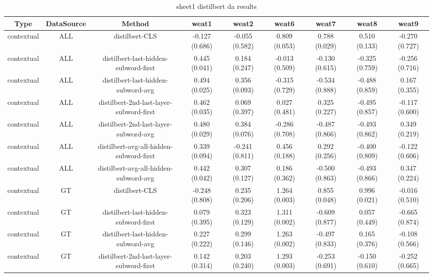 \begin{sidewaystable}[htb]
    \centering
    \caption{sheet1 distilbert da results}
    \label{appendix_tab:sheet1_distilbert_da_results}
    \small
    \begin{tabular}{@{}ccccccccc@{}}
        \toprule
        Type & DataSource & Method & weat1 & weat2 & weat6 & weat7 & weat8 & weat9 \\
        \midrule
        contextual & ALL & distilbert-CLS & -0.127 (0.686) & -0.055 (0.582) & 0.809 (0.053) & 0.788 (0.029) & 0.510 (0.133) & -0.270 (0.727) \\
        contextual & ALL & distilbert-last-hidden-subword-first & 0.445 (0.041) & 0.184 (0.247) & -0.013 (0.509) & -0.130 (0.615) & -0.325 (0.759) & -0.256 (0.716) \\
        contextual & ALL & distilbert-last-hidden-subword-avg & 0.494 (0.025) & 0.356 (0.093) & -0.315 (0.729) & -0.534 (0.888) & -0.488 (0.859) & 0.167 (0.355) \\
        contextual & ALL & distilbert-2nd-last-layer-subword-first & 0.462 (0.035) & 0.069 (0.397) & 0.027 (0.481) & 0.325 (0.227) & -0.495 (0.857) & -0.117 (0.600) \\
        contextual & ALL & distilbert-2nd-last-layer-subword-avg & 0.480 (0.029) & 0.384 (0.076) & -0.286 (0.708) & -0.487 (0.866) & -0.493 (0.862) & 0.349 (0.219) \\
        contextual & ALL & distilbert-avg-all-hidden-subword-first & 0.339 (0.094) & -0.241 (0.811) & 0.456 (0.188) & 0.292 (0.256) & -0.400 (0.809) & -0.122 (0.606) \\
        contextual & ALL & distilbert-avg-all-hidden-subword-avg & 0.442 (0.042) & 0.307 (0.127) & 0.186 (0.362) & -0.500 (0.863) & -0.493 (0.866) & 0.347 (0.224) \\
        contextual & GT & distilbert-CLS & -0.248 (0.808) & 0.235 (0.206) & 1.264 (0.003) & 0.855 (0.048) & 0.996 (0.021) & -0.016 (0.510) \\
        contextual & GT & distilbert-last-hidden-subword-first & 0.079 (0.395) & 0.323 (0.129) & 1.311 (0.002) & -0.609 (0.877) & 0.057 (0.449) & -0.665 (0.874) \\
        contextual & GT & distilbert-last-hidden-subword-avg & 0.227 (0.222) & 0.299 (0.146) & 1.263 (0.002) & -0.497 (0.833) & 0.165 (0.376) & -0.108 (0.566) \\
        contextual & GT & distilbert-2nd-last-layer-subword-first & 0.142 (0.314) & 0.203 (0.240) & 1.293 (0.003) & -0.253 (0.691) & -0.150 (0.610) & -0.252 (0.665) \\

\end{tabular}
\end{sidewaystable}
